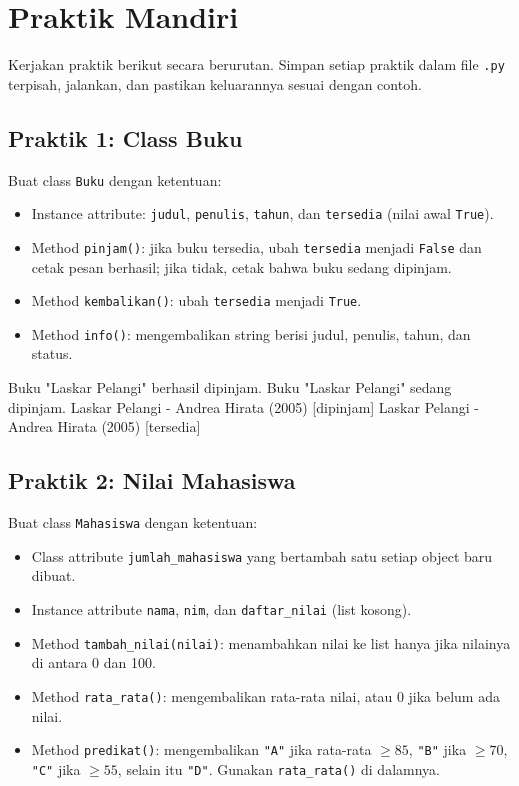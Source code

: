 \section{Praktik Mandiri}

Kerjakan praktik berikut secara berurutan. Simpan setiap praktik dalam file \texttt{.py} terpisah, jalankan, dan pastikan keluarannya sesuai dengan contoh.

\subsection{Praktik 1: Class Buku}

Buat class \texttt{Buku} dengan ketentuan:

\begin{itemize}
  \item Instance attribute: \texttt{judul}, \texttt{penulis}, \texttt{tahun}, dan \texttt{tersedia} (nilai awal \texttt{True}).
  \item Method \texttt{pinjam()}: jika buku tersedia, ubah \texttt{tersedia} menjadi \texttt{False} dan cetak pesan berhasil; jika tidak, cetak bahwa buku sedang dipinjam.
  \item Method \texttt{kembalikan()}: ubah \texttt{tersedia} menjadi \texttt{True}.
  \item Method \texttt{info()}: mengembalikan string berisi judul, penulis, tahun, dan status.
\end{itemize}

\begin{keluaran}
Buku "Laskar Pelangi" berhasil dipinjam.
Buku "Laskar Pelangi" sedang dipinjam.
Laskar Pelangi - Andrea Hirata (2005) [dipinjam]
Laskar Pelangi - Andrea Hirata (2005) [tersedia]
\end{keluaran}

\subsection{Praktik 2: Nilai Mahasiswa}

Buat class \texttt{Mahasiswa} dengan ketentuan:

\begin{itemize}
  \item Class attribute \texttt{jumlah\_mahasiswa} yang bertambah satu setiap object baru dibuat.
  \item Instance attribute \texttt{nama}, \texttt{nim}, dan \texttt{daftar\_nilai} (list kosong).
  \item Method \texttt{tambah\_nilai(nilai)}: menambahkan nilai ke list hanya jika nilainya di antara 0 dan 100.
  \item Method \texttt{rata\_rata()}: mengembalikan rata-rata nilai, atau 0 jika belum ada nilai.
  \item Method \texttt{predikat()}: mengembalikan \texttt{"A"} jika rata-rata $\geq 85$, \texttt{"B"} jika $\geq 70$, \texttt{"C"} jika $\geq 55$, selain itu \texttt{"D"}. Gunakan \texttt{rata\_rata()} di dalamnya.
\end{itemize}

